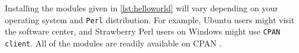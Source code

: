 Installing the modules given in \cref{lst:helloworld} will vary depending on your 
operating system and \lstinline!Perl! distribution. For example, Ubuntu users 
might visit the software center, and Strawberry Perl users on Windows might use 
\lstinline!CPAN client!. All of the modules are readily available on CPAN \cite{cpan}.


      

